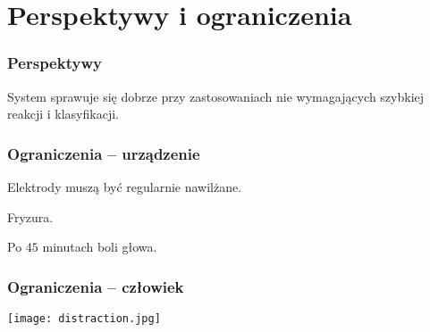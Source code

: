 \documentclass{beamer}
\begin{document}
\section{Perspektywy i ograniczenia}
\begin{frame} \frametitle{Perspektywy}
System sprawuje się dobrze przy zastosowaniach nie wymagających szybkiej reakcji i klasyfikacji.
\end{frame}

\begin{frame} \frametitle{Ograniczenia -- urządzenie}
Elektrody muszą być regularnie nawilżane.

Fryzura.

Po $45$ minutach boli głowa.
\end{frame}

\begin{frame} \frametitle{Ograniczenia -- człowiek}
\texttt{[image: distraction.jpg]}
\end{frame}
\end{document}
